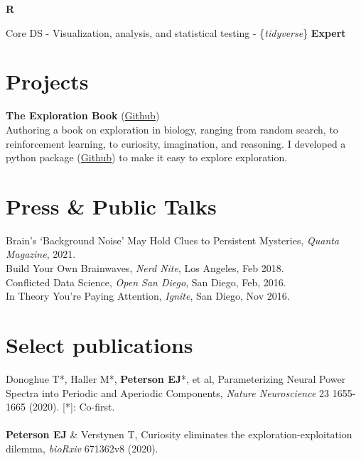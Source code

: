 \documentclass[margin,line]{res}
\newenvironment{list1}{
    \begin{list}{\ding{113}}{%
        \setlength{\itemsep}{0in}
        \setlength{\parsep}{0in} \setlength{\parskip}{0in}
        \setlength{\topsep}{0in} \setlength{\partopsep}{0in}
        \setlength{\leftmargin}{0.17in}}}{
    \end{list}}
\begin{document}
\begin{resume}
\vspace{-.5cm}
{\bf R} \\
\vspace*{-.2in}
\begin{list1}
    \tightlist
    \item[] Core DS - Visualization, analysis, and statistical testing - \{\emph{tidyverse}\} \hfill {\bf Expert}
\end{list1}



\vspace{-.1cm}
\section{\sc Projects}
\vspace{-.1cm}
{\bf The Exploration Book} (\href{https://github.com/parenthetical-e/explorations-book}{Github}) \\
Authoring a book on exploration in biology, ranging from random search, to reinforcement learning, to curiosity, imagination, and reasoning. I developed a python package (\href{https://github.com/parenthetical-e/explorationlib}{Github}) to make it easy to explore exploration. 

\vspace{-.2cm}
\section{\sc Press \& Public Talks}
Brain's `Background Noise' May Hold Clues to Persistent Mysteries, \emph{Quanta Magazine}, 2021. \\
Build Your Own Brainwaves, \emph{Nerd Nite}, Los Angeles, Feb 2018. \\
Conflicted Data Science, \emph{Open San Diego}, San Diego, Feb, 2016. \\
In Theory You're Paying Attention, \emph{Ignite}, San Diego, Nov 2016. \\
    
\vspace{-.4cm} 
\section{\sc Select publications}
Donoghue T*, Haller M*, \textbf{Peterson EJ}*, et al, Parameterizing Neural Power Spectra into Periodic and Aperiodic Components, \emph{Nature Neuroscience} 23 1655-1665 (2020). [*]: Co-first. 
\\ 
\vspace{-.35cm} 
\\
\textbf{Peterson EJ} \& Verstynen T, Curiosity eliminates the exploration-exploitation dilemma, \emph{bioRxiv} 671362v8 (2020). 

\end{resume}
\end{document}
